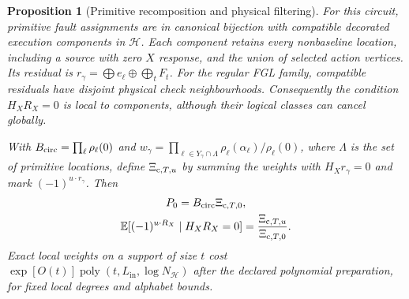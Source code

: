 \documentclass[10pt,twocolumn]{article}
\newtheorem{proposition}[theorem]{Proposition}
\theoremstyle{definition}
\DeclareMathOperator{\poly}{poly}
\newcommand{\Lin}{L_{\mathrm{in}}}
\begin{document}
\begin{proposition}[Primitive recomposition and physical filtering]
\label{prop:circ-recomp}
For this circuit, primitive fault assignments are in canonical bijection
with compatible decorated execution components in $\mathcal H$.
Each component retains every nonbaseline location, including a source
with zero $X$ response, and the union of selected action vertices.
Its residual is $r_\gamma=\bigoplus e_\ell\oplus\bigoplus_t F_t$.
For the regular FGL family, compatible residuals have disjoint physical
check neighbourhoods. Consequently the condition $H_XR_X=0$ is local
to components, although their logical classes can cancel globally.

With $B_{\rm circ}=\prod_\ell\rho_\ell(0)$ and
$w_\gamma=\prod_{\ell\in Y_\gamma\cap\Lambda}\rho_\ell(\alpha_\ell)/\rho_\ell(0)$,
where $\Lambda$ is the set of primitive locations,
define $\Xi_{{\rm c},T,u}$ by summing the weights with
$H_Xr_\gamma=0$ and mark $(-1)^{u\cdot r_\gamma}$. Then
\begin{equation}\label{eq:circ-filtered-identities}
\begin{gathered}
 P_0=B_{\rm circ}\Xi_{{\rm c},T,0},\\
 \mathbb E[(-1)^{u\cdot R_X}\mid H_XR_X=0]
       =\frac{\Xi_{{\rm c},T,u}}{\Xi_{{\rm c},T,0}}.
\end{gathered}
\end{equation}
Exact local weights on a support of size $t$ cost
$\exp[O(t)]\poly(t,\Lin,\log N_{\mathcal H})$ after the declared
polynomial preparation, for fixed local degrees and alphabet bounds.
\end{proposition}
\end{document}
